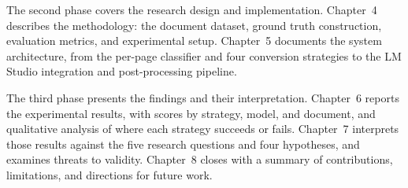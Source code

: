 The second phase covers the research design and implementation. Chapter~4
describes the methodology: the document dataset, ground truth construction,
evaluation metrics, and experimental setup. Chapter~5 documents the system
architecture, from the per-page classifier and four conversion strategies to
the LM Studio integration and post-processing pipeline.

The third phase presents the findings and their interpretation. Chapter~6
reports the experimental results, with scores by strategy, model, and
document, and qualitative analysis of where each strategy succeeds or fails.
Chapter~7 interprets those results against the five research questions and
four hypotheses, and examines threats to validity. Chapter~8 closes with a
summary of contributions, limitations, and directions for future work.
